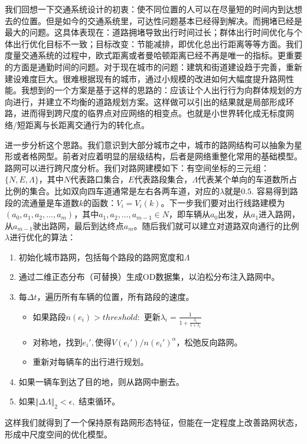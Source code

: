 我们回想一下交通系统设计的初衷：使不同位置的人可以在尽量短的时间内到达想去的位置。但是如今的交通系统里，可达性问题基本已经得到解决。而拥堵已经是最大的问题。这具体表现在：道路拥堵导致出行时间过长；群体出行时间优化与个体出行优化目标不一致；目标改变：节能减排，即优化总出行距离等等方面。我们度量交通系统的过程中，欧式距离或者曼哈顿距离已经不再是唯一的指标。更重要的方面是通勤时间的问题。对于现在城市的问题：建筑和街道建设趋于完善，重新建设难度巨大。很难根据现有的城市，通过小规模的改进如何大幅度提升路网性能。我想到的一个方案是基于这样的思路的：应该让个人出行行为向群体规划的方向进行，并建立不均衡的道路规划方案。这样做可以引出的结果就是局部形成环路，进而得到跨尺度的临界点对应网络的相变点。也就是小世界转化成无标度网络/短距离与长距离交通行为的转化点。

进一步分析这个思路。我们意识到大部分城市之中，城市的路网结构可以抽象为星形或者格网型。前者对应着明显的层级结构，后者是网络重整化常用的基础模型。路网可以进行跨尺度分析。我们对路网建模如下：有空间坐标的三元组：$\{N,E,\Lambda\}$，其中$N$代表路口集合，$E$代表路段集合，$\Lambda$代表某个单向的车道数所占比例的集合。比如双向四车道通常是左右各两车道，对应的$\lambda$就是$0.5$. 容易得到路段的流通量是车道数$k$的函数：$V_i = V_i(k)$。下一步我们要对出行线路建模为$(a_0,a_1,a_2,\dots,a_m)$，其中$a_1,a_2,\dots,a_{m-1}\in N$，即车辆从$a_0$出发，从$a_1$进入路网，从$a_{m-1}$驶出路网，最后到达终点$a_m$。随后我们就可以建立对道路双向通行的比例$\lambda$进行优化的算法：\begin{enumerate}
  \item 初始化城市路网，包括每个路段的路网宽度和$\Lambda$
  \item 通过二维正态分布（可替换）生成OD数据集，以泊松分布注入路网中。
  \item 每$\Delta t$，遍历所有车辆的位置，所有路段的速度。
  \begin{itemize}
      \item 如果路段$n(e_i)>threshold: $  更新$\lambda_i = \frac{1}{1+\frac{\lambda_i}{1+\lambda_i}}$
      \item 对称地，找到$e_i',$使得$V(e_i')/n(e_i')^\alpha$，松弛反向路网。
      \item 重新对每辆车的出行进行规划。
  \end{itemize}
  \item 如果一辆车到达了目的地，则从路网中删去。
  \item 如果$\Vert \Delta\Lambda\Vert_2<\epsilon,$ 结束循环。
\end{enumerate}
这样我们就得到了一个保持原有路网形态特征，但能在一定程度上改善路网状态，形成中尺度空间的优化模型。


